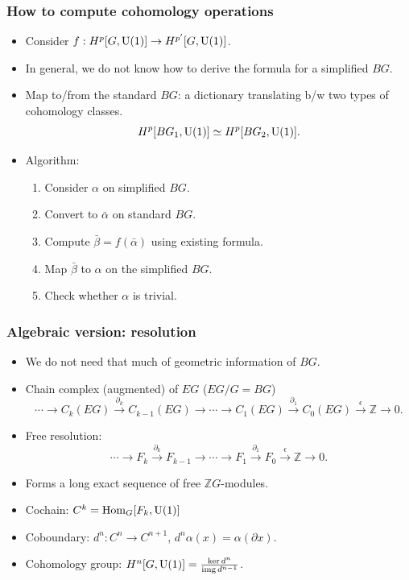 \documentclass[xcolor=table, aspectratio=169,ignorenonframetext]{beamer}
\DeclareMathOperator{\img}{img}
\DeclareMathOperator{\hhom}{Hom}
\newcommand{\uone}{\text U(1)}
\begin{document}
\begin{frame}
	\frametitle{How to compute cohomology operations}
	\begin{itemize}
		\item Consider $f: H^p[G,\uone]\rightarrow H^{p'}[G, \uone]$.
		\item In general, we do not know how to derive the formula for a simplified $BG$.
		\item Map to/from the standard $BG$: a dictionary translating b/w two types of cohomology classes.
		\[H^p[BG_1,\uone]\simeq H^p[BG_2,\uone].\]
		\item Algorithm:
		\begin{enumerate}
			\item Consider $\alpha$ on simplified $BG$.
			\item Convert to $\bar\alpha$ on standard $BG$.
			\item Compute $\bar\beta = f(\bar\alpha)$ using existing formula.
			\item Map $\bar\beta$ to $\alpha$ on the simplified $BG$.
			\item Check whether $\alpha$ is trivial.
		\end{enumerate}
	\end{itemize}
\end{frame}

\begin{frame}
	\frametitle{Algebraic version: resolution}
	\begin{itemize}
		\item We do not need that much of geometric information of $BG$.
		\item Chain complex (augmented) of $EG$ ($EG/G=BG$)
                {\small\[\cdots\rightarrow C_k(EG)\xrightarrow{\partial_k}
		C_{k-1}(EG)\rightarrow\cdots\rightarrow
		C_1(EG)\xrightarrow{\partial_1}
		C_0(EG)\xrightarrow{\epsilon}\mathbb Z\rightarrow0.\]}
		\item Free resolution:
		{\small\[\cdots\rightarrow F_k\xrightarrow{\partial_k}
		F_{k-1}\rightarrow\cdots\rightarrow
		F_1\xrightarrow{\partial_1}
		F_0\xrightarrow{\epsilon}\mathbb Z\rightarrow0.\]}
		\item Forms a long exact sequence of free $\mathbb ZG$-modules.
		\item Cochain: $C^k=\hhom_G[F_k, \uone]$
		\item Coboundary: $d^n:C^n\rightarrow C^{n+1}$, $d^n\alpha(x) = \alpha(\partial x)$.
		\item Cohomology group: $H^n[G, \uone]=\frac{\ker d^n}{\img d^{n-1}}$.
	\end{itemize}
\end{frame}
\end{document}
